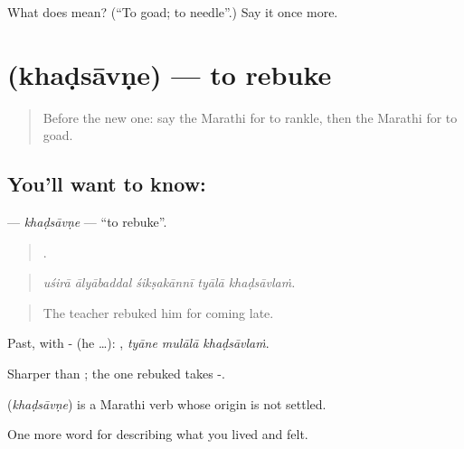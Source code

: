 \begin{tcolorbox}[breakable,colback=teal!4,colframe=teal!35!black,title={Before you move on}]
What does  mean? (\textquotedblleft{}To goad; to needle\textquotedblright{}.) Say it once more.
\end{tcolorbox}
\section[\texorpdfstring{\mr{खडसावणे} (khaḍsāvṇe)}{खडसावणे (khaḍsāvṇe)}]{ (khaḍsāvṇe) — to rebuke}

\label{lesson:MR-C503-khadsavne}



\begin{quote}
Before the new one: say the Marathi for to rankle, then the Marathi for to goad.
\end{quote}

\subsection*{You'll want to know: }
\textbf{} — \emph{khaḍsāvṇe} — \textquotedblleft{}to rebuke\textquotedblright{}.

\begin{quote}
    .
\end{quote}

\begin{quote}
\emph{uśirā ālyābaddal śikṣakānnī tyālā khaḍsāvlaṁ.}
\end{quote}

\begin{quote}
The teacher rebuked him for coming late.
\end{quote}

Past, with - (he …):   , \emph{tyāne mulālā khaḍsāvlaṁ}.

Sharper than ; the one rebuked takes -.

\begin{cousinweb}
\textbf{} (\emph{khaḍsāvṇe}) is a Marathi verb whose origin is not settled.
\end{cousinweb}

\begin{grammarlens}[title={What you've built}]
One more word for describing what you lived and felt.
\end{grammarlens}

